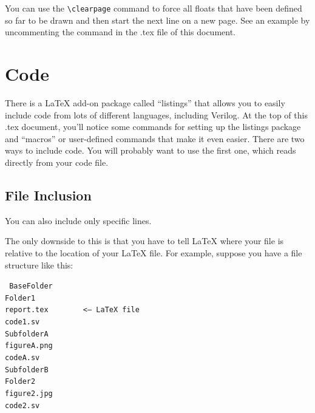 \documentclass[11pt]{article}
\newcommand{\Verilog}[2][]{%
	
}
\begin{document}
You can use the \verb|\clearpage| command to force all floats that have been defined so far to be drawn and then start the next line on a new page.  See an example by uncommenting the command in the .tex file of this document.


\section*{Code}
There is a LaTeX add-on package called ``listings'' that allows you to easily include code from lots of different languages, including Verilog.  At the top of this .tex document, you'll notice some commands for setting up the listings package and ``macros'' or user-defined commands that make it even easier.  There are two ways to include code.  You will probably want to use the first one, which reads directly from your code file.  

\subsection*{File Inclusion}

\Verilog[caption=File-included Verilog code example,label=code:file_ex]{example_or.sv}

You can also include only specific lines.

\Verilog[firstline=6, lastline=7, caption=Selected lines from example file,
label=code:file_ex_lines]{example_or.sv}

The only downside to this is that you have to tell LaTeX where your file is relative to the location of your LaTeX file.  For example, suppose you have a file structure like this:

\texttt{%
\hspace*{5ex}BaseFolder \\
	\hspace*{10ex}Folder1 \\
		\hspace*{15ex}report.tex ~~~~~~ <-- LaTeX file\\
		\hspace*{15ex}code1.sv \\
		\hspace*{15ex}SubfolderA \\
			\hspace*{20ex}figureA.png \\
			\hspace*{20ex}codeA.sv \\
		\hspace*{15ex}SubfolderB \\
	\hspace*{10ex}Folder2 \\	
		\hspace*{15ex}figure2.jpg \\
		\hspace*{15ex}code2.sv 
}
\end{document}
